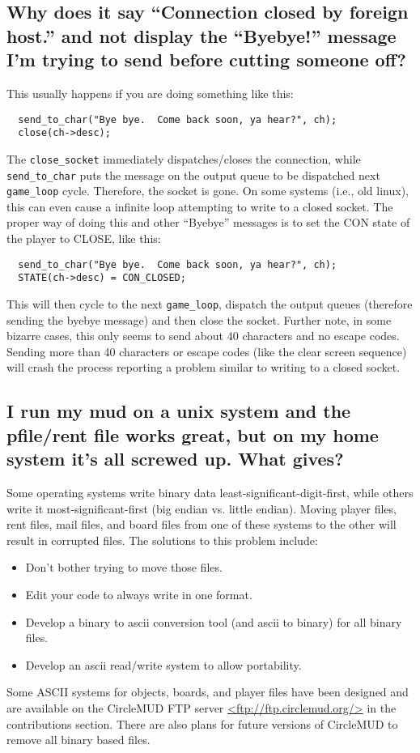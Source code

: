 \documentclass[11pt]{article}
\begin{document}
\subsection{Why does it say ``Connection closed by foreign host.'' and not display the ``Byebye!'' message I'm trying to send before cutting someone off?}
This usually happens if you are doing something like this:
\begin{verbatim}
  send_to_char("Bye bye.  Come back soon, ya hear?", ch);
  close(ch->desc);
\end{verbatim}
The \texttt{close\_socket} immediately dispatches/closes the connection, while \texttt{send\_to\_char} puts the message on the output queue to be dispatched next
\texttt{game\_loop} cycle. Therefore, the socket is gone.  On some systems (i.e., old linux), this can even cause a infinite loop attempting to write to a closed socket. The proper way of doing this and other ``Byebye'' messages is to set the CON state of the player to CLOSE, like this:
\begin{verbatim}
  send_to_char("Bye bye.  Come back soon, ya hear?", ch);
  STATE(ch->desc) = CON_CLOSED;
\end{verbatim}
This will then cycle to the next \texttt{game\_loop}, dispatch the output queues (therefore sending the byebye message) and then close the socket. Further note, in some bizarre cases, this only seems to send about 40 characters and no escape codes.  Sending more than 40 characters or escape codes (like the clear screen sequence) will crash the process reporting a problem similar to writing to a closed socket. 

\subsection{I run my mud on a unix system and the pfile/rent file works great, but on my home system it's all screwed up.  What gives?}
Some operating systems write binary data least-significant-digit-first, while others write it most-significant-first (big endian vs. little endian). Moving player files, rent files, mail files, and board files from one of these systems to the other will result in corrupted files.  The solutions to this problem include:
\begin{itemize}
\item Don't bother trying to move those files.
\item Edit your code to always write in one format.
\item Develop a binary to ascii conversion tool (and ascii to binary) for all binary files.
\item Develop an ascii read/write system to allow portability.
\end{itemize}
Some ASCII systems for objects, boards, and player files have been designed and are available on the CircleMUD FTP server \url{<ftp://ftp.circlemud.org/>} in the contributions section.  There are also plans for future versions of CircleMUD to remove all binary based files.
\end{document}
